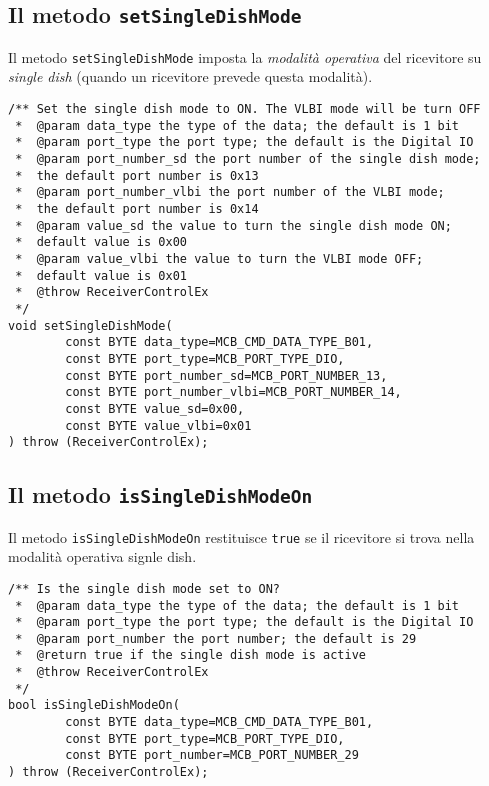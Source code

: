 \subsection{Il metodo \texttt{setSingleDishMode}}
Il metodo \texttt{setSingleDishMode} imposta la 
\emph{modalit\`a operativa} del 
ricevitore su \emph{single dish} (quando
un ricevitore prevede questa modalit\`a).
\lstset{language=C++}
\begin{lstlisting}[caption={Dichiarazione del metodo \texttt{setSingleDishMode}},
label=lst:setSingleDishMode,mathescape]
/** Set the single dish mode to ON. The VLBI mode will be turn OFF
 *  @param data_type the type of the data; the default is 1 bit
 *  @param port_type the port type; the default is the Digital IO
 *  @param port_number_sd the port number of the single dish mode; 
 *  the default port number is 0x13
 *  @param port_number_vlbi the port number of the VLBI mode; 
 *  the default port number is 0x14
 *  @param value_sd the value to turn the single dish mode ON; 
 *  default value is 0x00
 *  @param value_vlbi the value to turn the VLBI mode OFF; 
 *  default value is 0x01
 *  @throw ReceiverControlEx
 */
void setSingleDishMode(
        const BYTE data_type=MCB_CMD_DATA_TYPE_B01,
        const BYTE port_type=MCB_PORT_TYPE_DIO,
        const BYTE port_number_sd=MCB_PORT_NUMBER_13,
        const BYTE port_number_vlbi=MCB_PORT_NUMBER_14,
        const BYTE value_sd=0x00,
        const BYTE value_vlbi=0x01
) throw (ReceiverControlEx);
\end{lstlisting}
\lstset{numbers=none}


\subsection{Il metodo \texttt{isSingleDishModeOn}}
Il metodo \texttt{isSingleDishModeOn} restituisce \texttt{true} se il ricevitore
si trova nella modalit\`a operativa signle dish.
\lstset{language=C++}
\begin{lstlisting}[caption={Dichiarazione del metodo \texttt{isSingleDishModeOn}},
label=lst:isSingleDishModeOn,mathescape]
/** Is the single dish mode set to ON?
 *  @param data_type the type of the data; the default is 1 bit
 *  @param port_type the port type; the default is the Digital IO
 *  @param port_number the port number; the default is 29
 *  @return true if the single dish mode is active
 *  @throw ReceiverControlEx
 */
bool isSingleDishModeOn(
        const BYTE data_type=MCB_CMD_DATA_TYPE_B01,
        const BYTE port_type=MCB_PORT_TYPE_DIO, 
        const BYTE port_number=MCB_PORT_NUMBER_29
) throw (ReceiverControlEx);
\end{lstlisting}
\lstset{numbers=none}


